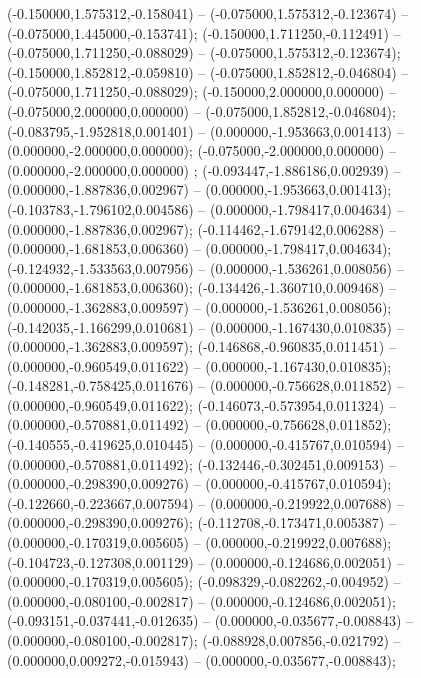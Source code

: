 (-0.150000,1.575312,-0.158041) -- (-0.075000,1.575312,-0.123674) -- (-0.075000,1.445000,-0.153741);
 (-0.150000,1.711250,-0.112491) -- (-0.075000,1.711250,-0.088029) -- (-0.075000,1.575312,-0.123674);
 (-0.150000,1.852812,-0.059810) -- (-0.075000,1.852812,-0.046804) -- (-0.075000,1.711250,-0.088029);
 (-0.150000,2.000000,0.000000) -- (-0.075000,2.000000,0.000000) -- (-0.075000,1.852812,-0.046804);
 (-0.083795,-1.952818,0.001401) -- (0.000000,-1.953663,0.001413) -- (0.000000,-2.000000,0.000000);
 (-0.075000,-2.000000,0.000000) -- (0.000000,-2.000000,0.000000) ;
 (-0.093447,-1.886186,0.002939) -- (0.000000,-1.887836,0.002967) -- (0.000000,-1.953663,0.001413);
 (-0.103783,-1.796102,0.004586) -- (0.000000,-1.798417,0.004634) -- (0.000000,-1.887836,0.002967);
 (-0.114462,-1.679142,0.006288) -- (0.000000,-1.681853,0.006360) -- (0.000000,-1.798417,0.004634);
 (-0.124932,-1.533563,0.007956) -- (0.000000,-1.536261,0.008056) -- (0.000000,-1.681853,0.006360);
 (-0.134426,-1.360710,0.009468) -- (0.000000,-1.362883,0.009597) -- (0.000000,-1.536261,0.008056);
 (-0.142035,-1.166299,0.010681) -- (0.000000,-1.167430,0.010835) -- (0.000000,-1.362883,0.009597);
 (-0.146868,-0.960835,0.011451) -- (0.000000,-0.960549,0.011622) -- (0.000000,-1.167430,0.010835);
 (-0.148281,-0.758425,0.011676) -- (0.000000,-0.756628,0.011852) -- (0.000000,-0.960549,0.011622);
 (-0.146073,-0.573954,0.011324) -- (0.000000,-0.570881,0.011492) -- (0.000000,-0.756628,0.011852);
 (-0.140555,-0.419625,0.010445) -- (0.000000,-0.415767,0.010594) -- (0.000000,-0.570881,0.011492);
 (-0.132446,-0.302451,0.009153) -- (0.000000,-0.298390,0.009276) -- (0.000000,-0.415767,0.010594);
 (-0.122660,-0.223667,0.007594) -- (0.000000,-0.219922,0.007688) -- (0.000000,-0.298390,0.009276);
 (-0.112708,-0.173471,0.005387) -- (0.000000,-0.170319,0.005605) -- (0.000000,-0.219922,0.007688);
 (-0.104723,-0.127308,0.001129) -- (0.000000,-0.124686,0.002051) -- (0.000000,-0.170319,0.005605);
 (-0.098329,-0.082262,-0.004952) -- (0.000000,-0.080100,-0.002817) -- (0.000000,-0.124686,0.002051);
 (-0.093151,-0.037441,-0.012635) -- (0.000000,-0.035677,-0.008843) -- (0.000000,-0.080100,-0.002817);
 (-0.088928,0.007856,-0.021792) -- (0.000000,0.009272,-0.015943) -- (0.000000,-0.035677,-0.008843);
